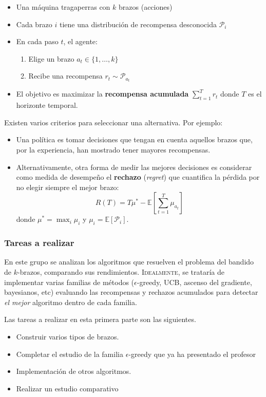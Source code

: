 \documentclass[a4paper, 11pt]{article}
\begin{document}
\begin{itemize}
    \item Una máquina tragaperras con \( k \) brazos (acciones)
    \item Cada brazo \( i \) tiene una distribución de recompensa desconocida \( \mathcal{P}_i \)
    \item En cada paso \( t \), el agente:
    \begin{enumerate}
        \item Elige un brazo \( a_t \in \{1,\ldots,k\} \)
        \item Recibe una recompensa \( r_t \sim \mathcal{P}_{a_t} \)
    \end{enumerate}
    \item El objetivo es maximizar la \textbf{recompensa acumulada} $\sum_{t=1}^T r_t$ donde \( T \) es el horizonte temporal.
\end{itemize}

Existen varios criterios para seleccionar una alternativa. Por ejemplo:
\begin{itemize}
    \item Una política es tomar decisiones que tengan en cuenta aquellos brazos que, por la experiencia, han mostrado tener mayores recompensas. 
    \item Alternativamente, otra forma de medir las mejores decisiones es considerar como medida de desempeño el \textcolor{UMUblue}{\textbf{rechazo}} (\textit{regret}) que cuantifica la pérdida por no elegir siempre el mejor brazo:
\[
R(T) = T\mu^* - \mathbb{E}\left[\sum_{t=1}^T \mu_{a_t}\right]
\]
donde \( \mu^* = \max_i \mu_i \) y \( \mu_i = \mathbb{E}[\mathcal{P}_i] \).

\end{itemize}




\subsubsection{Tareas a realizar}

En este grupo se analizan los algoritmos que resuelven el problema del bandido de \( k \)-brazos, comparando sus rendimientos. \textsc{Idealmente}, se trataría de implementar varias familias de métodos (\(\epsilon\)-greedy, UCB, ascenso del gradiente, bayesianos, etc) evaluando las recompensas y rechazos acumulados para detectar \textit{el mejor} algoritmo dentro de cada familia.


Las tareas a realizar en esta primera parte son las siguientes. 
\begin{itemize}
\item Construir varios tipos de brazos.
\item Completar el estudio de la familia $\epsilon$-greedy que ya ha presentado el profesor
\item Implementación de otros algoritmos.
\item Realizar un estudio comparativo
\end{itemize}
\end{document}
